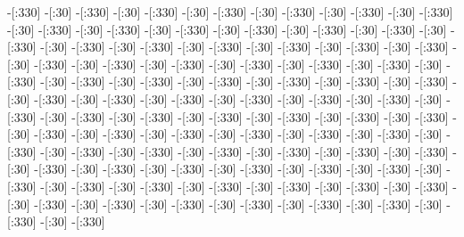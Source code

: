    -[:330]%
     -[:30]%
    -[:330]%
     -[:30]%
    -[:330]%
     -[:30]%
    -[:330]%
     -[:30]%
    -[:330]%
     -[:30]%
    -[:330]%
     -[:30]%
    -[:330]%
     -[:30]%
    -[:330]%
     -[:30]%
    -[:330]%
     -[:30]%
    -[:330]%
     -[:30]%
    -[:330]%
     -[:30]%
    -[:330]%
     -[:30]%
    -[:330]%
     -[:30]%
    -[:330]%
     -[:30]%
    -[:330]%
     -[:30]%
    -[:330]%
     -[:30]%
    -[:330]%
     -[:30]%
    -[:330]%
     -[:30]%
    -[:330]%
     -[:30]%
    -[:330]%
     -[:30]%
    -[:330]%
     -[:30]%
    -[:330]%
     -[:30]%
    -[:330]%
     -[:30]%
    -[:330]%
     -[:30]%
    -[:330]%
     -[:30]%
    -[:330]%
     -[:30]%
    -[:330]%
     -[:30]%
    -[:330]%
     -[:30]%
    -[:330]%
     -[:30]%
    -[:330]%
     -[:30]%
    -[:330]%
     -[:30]%
    -[:330]%
     -[:30]%
    -[:330]%
     -[:30]%
    -[:330]%
     -[:30]%
    -[:330]%
     -[:30]%
    -[:330]%
     -[:30]%
    -[:330]%
     -[:30]%
    -[:330]%
     -[:30]%
    -[:330]%
     -[:30]%
    -[:330]%
     -[:30]%
    -[:330]%
     -[:30]%
    -[:330]%
     -[:30]%
    -[:330]%
     -[:30]%
    -[:330]%
     -[:30]%
    -[:330]%
     -[:30]%
    -[:330]%
     -[:30]%
    -[:330]%
     -[:30]%
    -[:330]%
     -[:30]%
    -[:330]%
     -[:30]%
    -[:330]%
     -[:30]%
    -[:330]%
     -[:30]%
    -[:330]%
     -[:30]%
    -[:330]%
     -[:30]%
    -[:330]%
     -[:30]%
    -[:330]%
     -[:30]%
    -[:330]%
     -[:30]%
    -[:330]%
     -[:30]%
    -[:330]%
     -[:30]%
    -[:330]%
     -[:30]%
    -[:330]%
     -[:30]%
    -[:330]%
     -[:30]%
    -[:330]%
     -[:30]%
    -[:330]%
     -[:30]%
    -[:330]%
     -[:30]%
    -[:330]%
     -[:30]%
    -[:330]%
     -[:30]%
    -[:330]%
     -[:30]%
    -[:330]%
     -[:30]%
    -[:330]%
     -[:30]%
    -[:330]%
     -[:30]%
    -[:330]%
     -[:30]%
    -[:330]%
     -[:30]%
    -[:330]%
     -[:30]%
    -[:330]%
     -[:30]%
    -[:330]%
     -[:30]%
    -[:330]%
     -[:30]%
    -[:330]%
     -[:30]%
    -[:330]%
     -[:30]%
    -[:330]%
     -[:30]%
    -[:330]%
